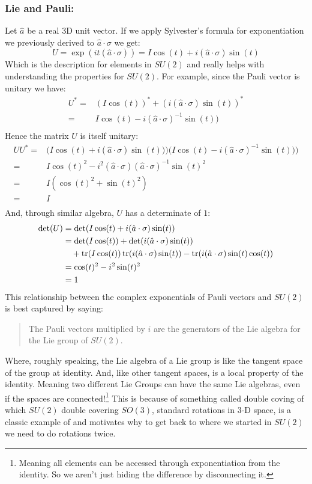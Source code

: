 \subsubsection{Lie and Pauli:}
Let $\hat{a}$ be a real $3$D unit vector.
If we apply Sylvester's formula for exponentiation we previously derived to $\hat{a}\cdot\sigma$ we get:
\[U = \exp(it(\hat{a}\cdot\sigma))=I\cos(t)+i(\hat{a}\cdot\sigma)\sin(t)\]
Which is the description for elements in $SU(2)$ and really helps with understanding the properties for $SU(2)$.
For example,
since the Pauli vector is unitary we have:
\[\begin{aligned}
	U^* =& (I\cos(t))^*+(i(\hat{a}\cdot\sigma)\sin(t))^*\\
	=& I\cos(t)-i(\hat{a}\cdot\sigma)^{-1}\sin(t))\\
\end{aligned}\]
Hence the matrix $U$ is itself unitary:
\[\begin{aligned}
	UU^*=&\big(I\cos(t)+i(\hat{a}\cdot\sigma)\sin(t))\big)\big(I\cos(t)-i(\hat{a}\cdot\sigma)^{-1}\sin(t))\big)\\
	=&I\cos(t)^2-i^2(\hat{a}\cdot\sigma)(\hat{a}\cdot\sigma)^{-1}\sin(t)^2\\
	=&I(\cos(t)^2+\sin(t)^2)\\
	=&I\\
\end{aligned}\]
And, through similar algebra, $U$ has a determinate of $1$:
\[\begin{aligned}
	\det(U)&=\det(I\cos(t)+i(\hat{a}\cdot\sigma)\sin(t))\\
	&=\det(I\cos(t))+\det(i(\hat{a}\cdot\sigma)\sin(t))\\
	&\quad+\operatorname{tr}(I\cos(t))\operatorname{tr}(i(\hat{a}\cdot\sigma)\sin(t))-\operatorname{tr}(i(\hat{a}\cdot\sigma)\sin(t)\cos(t))\\
	&=\cos(t)^2-i^2\sin(t)^2\\
	&=1\\
\end{aligned}\]
This relationship between the complex exponentials of Pauli vectors and $SU(2)$ is best captured by saying:
\begin{quote}
	The Pauli vectors multiplied by $i$ are the generators of the Lie algebra for the Lie group of $SU(2)$.
\end{quote}
Where,
roughly speaking,
the Lie algebra of a Lie group is like the tangent space of the group at identity.
And,
like other tangent spaces,
is a local property of the identity.
Meaning two different Lie Groups can have the same Lie algebras, 
even if the spaces are connected!\footnote{Meaning all elements can be accessed through exponentiation from the identity. So we aren't just hiding the difference by disconnecting it.}
This is because of something called double coving of which $SU(2)$ double covering $SO(3)$,
standard rotations in $3$-D space,
is a classic example of and motivates why to get back to where we started in $SU(2)$ we need to do rotations twice.
\\

